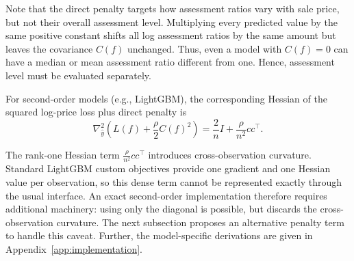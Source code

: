 \documentclass[10pt]{article}
\theoremstyle{definition}
\newcommand{\1}{\mathbf{1}}
\begin{document}
{Note that the direct penalty targets how assessment ratios vary with sale price, but not their overall assessment level. Multiplying every predicted value by the same positive constant shifts all log assessment ratios by the same amount but leaves the covariance $C(f)$ unchanged. Thus, even a model with $C(f)=0$ can have a median or mean assessment ratio different from one. Hence, assessment level must be evaluated separately.



{For second-order models (e.g., LightGBM), the corresponding Hessian of the squared log-price loss plus direct penalty is}
{
\begin{equation}
\label{eq:direct_gradient_hessian}
\nabla_{\widehat y}^2
\left(
L(f)+\frac{\rho}{2}C(f)^2
\right)
=
\frac{2}{n}I+\frac{\rho}{n^2}cc^\top.
\end{equation}
}
{The rank-one Hessian term $\frac{\rho}{n^{2}}cc^\top$ introduces cross-observation curvature. Standard LightGBM custom objectives provide one gradient and one Hessian value per observation, so this dense term cannot be represented exactly through the usual interface. An exact second-order implementation therefore requires additional machinery: using only the diagonal is possible, but discards the cross-observation curvature. The next subsection proposes an alternative penalty term to handle this caveat. Further, the model-specific derivations are given in Appendix~\ref{app:implementation}.



}}
\end{document}

